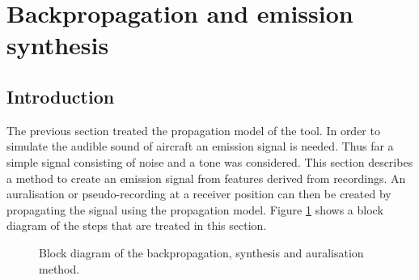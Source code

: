 \section{Backpropagation and emission synthesis}\label{sec:tool:synthesis}

\subsection{Introduction}
The previous section treated the propagation model of the tool. In order to
simulate the audible sound of aircraft an emission signal is needed. Thus far a
simple signal consisting of noise and a tone was considered. This section
describes a method to create an emission signal from features derived from
recordings. An auralisation or pseudo-recording at a receiver position can then
be created by propagating the signal using the propagation model. Figure
\ref{fig:tool:backpropagation:introduction:block-diagram} shows a block diagram
of the steps that are treated in this section.

\begin{figure}[H]
  \centering
{}
  \caption{Block diagram of the backpropagation, synthesis and auralisation method.}
  \label{fig:tool:backpropagation:introduction:block-diagram}
\end{figure}


